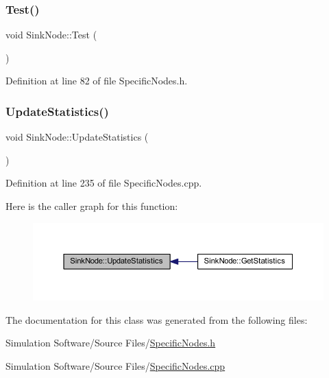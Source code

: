 \subsubsection{\texorpdfstring{Test()}{Test()}}
{\footnotesize\ttfamily void Sink\+Node\+::\+Test (\begin{DoxyParamCaption}{ }\end{DoxyParamCaption})\hspace{0.3cm}{\ttfamily [inline]}}



Definition at line 82 of file Specific\+Nodes.\+h.

\mbox{\label{class_sink_node_adf5f0001fd1d3d61725ff6a6f5b40ba7}} 
\subsubsection{\texorpdfstring{Update\+Statistics()}{UpdateStatistics()}}
{\footnotesize\ttfamily void Sink\+Node\+::\+Update\+Statistics (\begin{DoxyParamCaption}{ }\end{DoxyParamCaption})}



Definition at line 235 of file Specific\+Nodes.\+cpp.

Here is the caller graph for this function\+:
\nopagebreak
\begin{figure}[H]
\begin{center}
\leavevmode
\includegraphics[width=350pt]{class_sink_node_adf5f0001fd1d3d61725ff6a6f5b40ba7_icgraph}
\end{center}
\end{figure}


The documentation for this class was generated from the following files\+:\begin{DoxyCompactItemize}
\item 
Simulation Software/\+Source Files/\hyperlink{_specific_nodes_8h}{Specific\+Nodes.\+h}\item 
Simulation Software/\+Source Files/\hyperlink{_specific_nodes_8cpp}{Specific\+Nodes.\+cpp}\end{DoxyCompactItemize}

